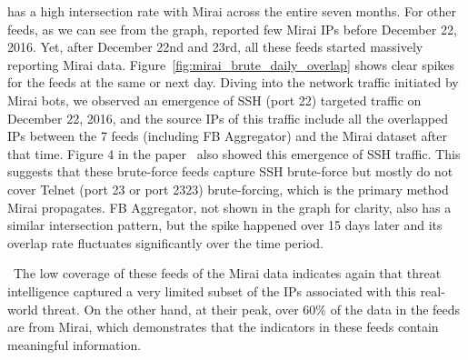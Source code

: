 {\feedbadipssh} has a high intersection rate with Mirai across the entire
seven months. For other feeds, as we can see from the graph, reported
few Mirai IPs before December 22, 2016.  Yet, after December 22nd and 23rd,
all these feeds started massively reporting Mirai data.
Figure~\ref{fig:mirai_brute_daily_overlap} shows clear spikes for the feeds
at the same or next day. Diving into the network traffic
initiated by Mirai bots, we observed an emergence of SSH (port 22)
targeted traffic on December 22, 2016, and the source IPs of this
traffic include all the overlapped IPs between the 7 feeds (including {FB Aggregator})
and the Mirai dataset after that time.
Figure 4 in the paper~\cite{antonakakis2017understanding}
also showed this emergence of SSH traffic. This suggests that
these brute-force feeds capture SSH brute-force but mostly do
not cover Telnet (port 23 or port 2323) brute-forcing, which is the primary method
Mirai propagates. {FB Aggregator}, not shown in the graph
for clarity, also has a similar intersection pattern, but the
spike happened over 15 days later and its overlap rate fluctuates
significantly over the time period.

\finding\ The low coverage of these feeds of the Mirai data indicates again
that threat intelligence captured a very limited subset of the IPs
associated with this real-world threat. On the other hand, at their
peak, over 60\% of the data in the feeds are from Mirai, which
demonstrates that the indicators in these feeds contain meaningful
information.




